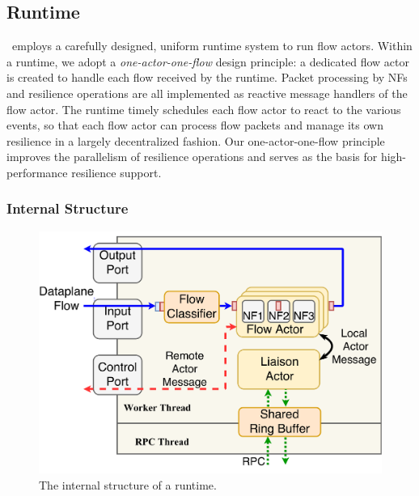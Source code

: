 \subsection{Runtime}
\label{sec:runtime}

\nfactor~employs a carefully designed, uniform runtime system to run flow actors. Within a runtime, we adopt a {\em one-actor-one-flow} design principle: a dedicated flow actor is created to handle each flow received by the runtime. Packet processing by NFs and resilience operations are all implemented as reactive message handlers of the flow actor. The runtime timely schedules each flow actor to react to the various events, so that each flow actor can process flow packets and manage its own resilience in a largely decentralized fashion. Our one-actor-one-flow principle improves the parallelism of resilience operations and serves as the basis for high-performance resilience support.


\subsubsection{Internal Structure}

\begin{figure}
		\centering
		\includegraphics[width=\columnwidth]{chap-nfvactor/figure/new-nfactor-runtime-arch.pdf}
		\caption{The internal structure of a runtime.}
\label{fig:runtime-arch}
\end{figure}

